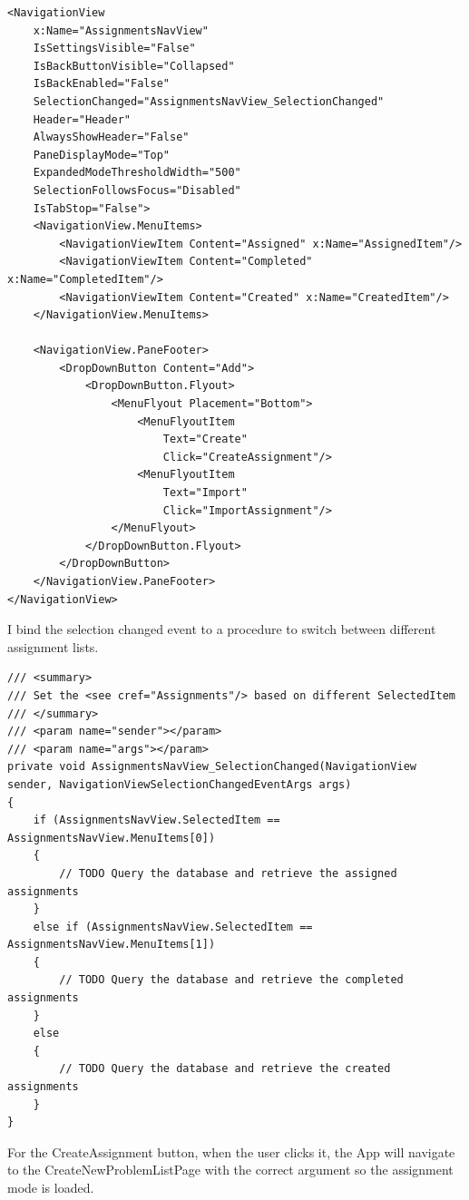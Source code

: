 \documentclass[a4paper]{report}
\begin{document}
\begin{verbatim}
<NavigationView 
    x:Name="AssignmentsNavView"
    IsSettingsVisible="False"
    IsBackButtonVisible="Collapsed"
    IsBackEnabled="False"
    SelectionChanged="AssignmentsNavView_SelectionChanged"
    Header="Header"
    AlwaysShowHeader="False"
    PaneDisplayMode="Top"
    ExpandedModeThresholdWidth="500"
    SelectionFollowsFocus="Disabled"
    IsTabStop="False">
    <NavigationView.MenuItems>
        <NavigationViewItem Content="Assigned" x:Name="AssignedItem"/>
        <NavigationViewItem Content="Completed" x:Name="CompletedItem"/>
        <NavigationViewItem Content="Created" x:Name="CreatedItem"/>
    </NavigationView.MenuItems>

    <NavigationView.PaneFooter>
        <DropDownButton Content="Add">
            <DropDownButton.Flyout>
                <MenuFlyout Placement="Bottom">
                    <MenuFlyoutItem 
                        Text="Create"
                        Click="CreateAssignment"/>
                    <MenuFlyoutItem 
                        Text="Import"
                        Click="ImportAssignment"/>
                </MenuFlyout>
            </DropDownButton.Flyout>
        </DropDownButton>
    </NavigationView.PaneFooter>
</NavigationView>
\end{verbatim}

I bind the selection changed event to a procedure to switch between different assignment lists.

\begin{verbatim}
/// <summary>
/// Set the <see cref="Assignments"/> based on different SelectedItem
/// </summary>
/// <param name="sender"></param>
/// <param name="args"></param>
private void AssignmentsNavView_SelectionChanged(NavigationView sender, NavigationViewSelectionChangedEventArgs args)
{
    if (AssignmentsNavView.SelectedItem == AssignmentsNavView.MenuItems[0])
    {
        // TODO Query the database and retrieve the assigned assignments
    }
    else if (AssignmentsNavView.SelectedItem == AssignmentsNavView.MenuItems[1])
    {
        // TODO Query the database and retrieve the completed assignments
    }
    else
    {
        // TODO Query the database and retrieve the created assignments
    }
}
\end{verbatim}

For the CreateAssignment button, when the user clicks it, the App will navigate to the CreateNewProblemListPage with the correct argument so the assignment mode is loaded.
\end{document}
